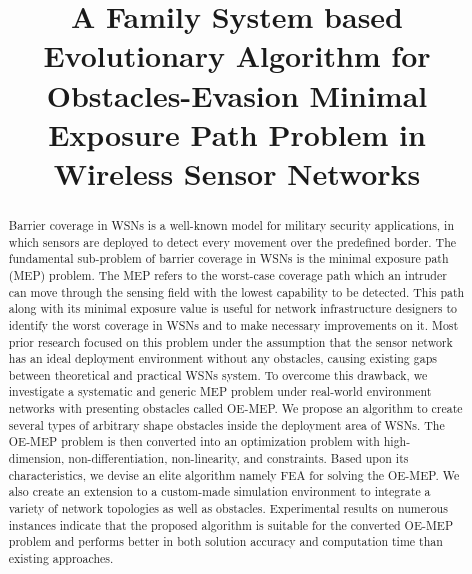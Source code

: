 \documentclass[final]{elsarticle}
\begin{document}
\begin{frontmatter}
\title{A Family System based Evolutionary Algorithm for Obstacles-Evasion Minimal Exposure Path Problem in Wireless Sensor Networks}


%
%
\begin{abstract}
Barrier coverage in WSNs is a well-known model for military security applications, in which sensors are deployed to detect every movement over the predefined border. The fundamental sub-problem of barrier coverage in WSNs is the minimal exposure path (MEP) problem. The MEP refers to the worst-case coverage path which an intruder can move through the sensing field with the lowest capability to be detected. This path along with its minimal exposure value is useful for network infrastructure designers to identify the worst coverage in WSNs and to make necessary improvements on it. Most prior research focused on this problem under the assumption that the sensor network has an ideal deployment environment without any obstacles, causing existing gaps between theoretical and practical WSNs system. To overcome this drawback, we investigate a systematic and generic MEP problem under real-world environment networks with presenting obstacles called OE-MEP. We propose an algorithm to create several types of arbitrary shape obstacles inside the deployment area of WSNs. The OE-MEP problem is then converted into an optimization problem with high-dimension, non-differentiation, non-linearity, and constraints. Based upon its characteristics, we devise an elite algorithm namely FEA for solving the OE-MEP. We also create an extension to a custom-made simulation environment to integrate a variety of network topologies as well as obstacles. Experimental results on numerous instances indicate that the proposed algorithm is suitable for the converted OE-MEP problem and performs better in both solution accuracy and computation time than existing approaches.
  

\end{abstract}
\end{frontmatter}
\end{document}
